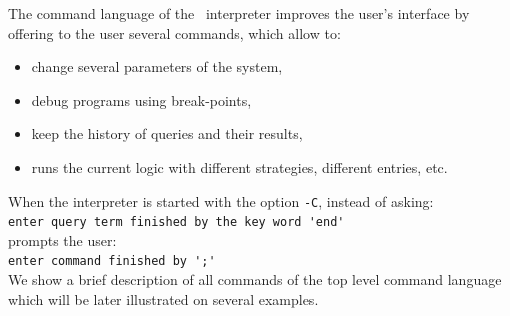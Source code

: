 The command language of the \elan\ interpreter improves the user's interface 
by offering to the user several commands, which allow to:
\begin{itemize}
  \item change several parameters of the system,
  \item debug programs using  break-points,
  \item keep the history of queries and their results,
  \item runs the current logic with different strategies, different entries, etc.
\end{itemize}

\noindent
When the \elan{} interpreter is started with the option \verb|-C|, instead of asking:\\
\verb|enter query term finished by the key word 'end'| \\
\elan{} prompts the user: \\
\verb|enter command finished by ';'| \\
We show a brief description of all commands of the top level command language
which will be later illustrated on several examples.
%
